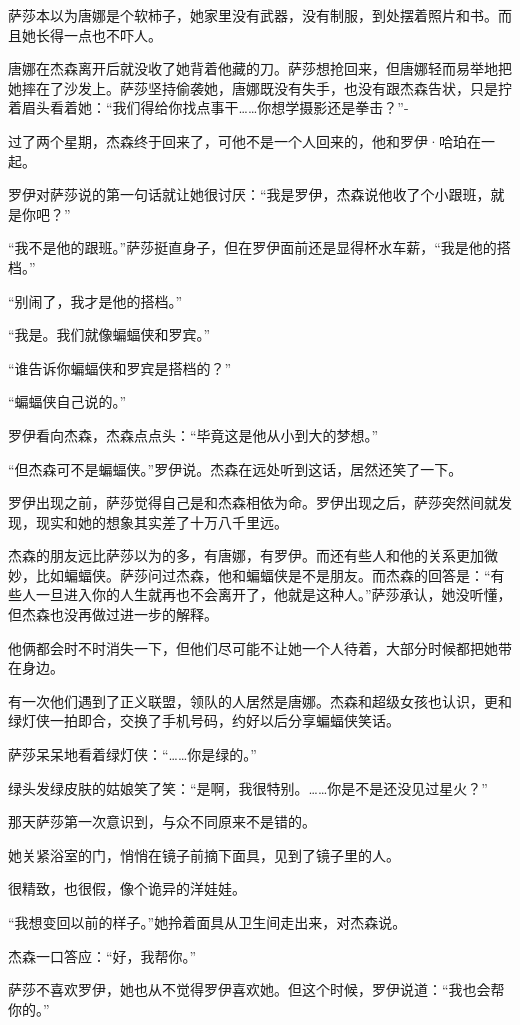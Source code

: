 \documentclass[../main]{subfiles}
\begin{document}
萨莎本以为唐娜是个软柿子，她家里没有武器，没有制服，到处摆着照片和书。而且她长得一点也不吓人。

唐娜在杰森离开后就没收了她背着他藏的刀。萨莎想抢回来，但唐娜轻而易举地把她摔在了沙发上。萨莎坚持偷袭她，唐娜既没有失手，也没有跟杰森告状，只是拧着眉头看着她：“我们得给你找点事干……你想学摄影还是拳击？”-

过了两个星期，杰森终于回来了，可他不是一个人回来的，他和罗伊·哈珀在一起。

罗伊对萨莎说的第一句话就让她很讨厌：“我是罗伊，杰森说他收了个小跟班，就是你吧？”

“我不是他的跟班。”萨莎挺直身子，但在罗伊面前还是显得杯水车薪，“我是他的搭档。”

“别闹了，我才是他的搭档。”

“我是。我们就像蝙蝠侠和罗宾。”

“谁告诉你蝙蝠侠和罗宾是搭档的？”

“蝙蝠侠自己说的。”

罗伊看向杰森，杰森点点头：“毕竟这是他从小到大的梦想。”

“但杰森可不是蝙蝠侠。”罗伊说。杰森在远处听到这话，居然还笑了一下。

罗伊出现之前，萨莎觉得自己是和杰森相依为命。罗伊出现之后，萨莎突然间就发现，现实和她的想象其实差了十万八千里远。

杰森的朋友远比萨莎以为的多，有唐娜，有罗伊。而还有些人和他的关系更加微妙，比如蝙蝠侠。萨莎问过杰森，他和蝙蝠侠是不是朋友。而杰森的回答是：“有些人一旦进入你的人生就再也不会离开了，他就是这种人。”萨莎承认，她没听懂，但杰森也没再做过进一步的解释。

他俩都会时不时消失一下，但他们尽可能不让她一个人待着，大部分时候都把她带在身边。

有一次他们遇到了正义联盟，领队的人居然是唐娜。杰森和超级女孩也认识，更和绿灯侠一拍即合，交换了手机号码，约好以后分享蝙蝠侠笑话。

萨莎呆呆地看着绿灯侠：“……你是绿的。”

绿头发绿皮肤的姑娘笑了笑：“是啊，我很特别。……你是不是还没见过星火？”

那天萨莎第一次意识到，与众不同原来不是错的。

她关紧浴室的门，悄悄在镜子前摘下面具，见到了镜子里的人。

很精致，也很假，像个诡异的洋娃娃。

“我想变回以前的样子。”她拎着面具从卫生间走出来，对杰森说。

杰森一口答应：“好，我帮你。”

萨莎不喜欢罗伊，她也从不觉得罗伊喜欢她。但这个时候，罗伊说道：“我也会帮你的。”
\end{document}
